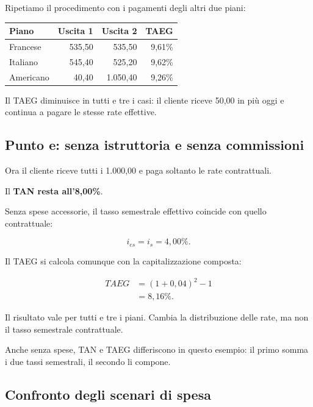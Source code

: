 \noindent Ripetiamo il procedimento
con i pagamenti degli altri due piani:

\begin{center}
    \begin{tabular}{|l|r|r|r|}
        \hline
        \textbf{Piano}
        & \textbf{Uscita 1}
        & \textbf{Uscita 2}
        & \textbf{TAEG} \\
        \hline
        Francese & 535,50 & 535,50 & 9,61\% \\
        Italiano & 545,40 & 525,20 & 9,62\% \\
        Americano & 40,40 & 1.050,40 & 9,26\% \\
        \hline
    \end{tabular}
\end{center}

\noindent Il TAEG diminuisce in tutti e tre i casi:
il cliente riceve 50,00 in più oggi
e continua a pagare le stesse rate effettive.


\subsection*{Punto e: senza istruttoria e senza commissioni}

\noindent Ora il cliente riceve
tutti i 1.000,00
e paga soltanto le rate contrattuali.

\noindent Il \textbf{TAN resta all'8,00\%}.

\noindent Senza spese accessorie,
il tasso semestrale effettivo
coincide con quello contrattuale:

\[
i_{es}=i_s=4{,}00\%.
\]

\noindent Il TAEG si calcola comunque
con la capitalizzazione composta:

\[
\begin{aligned}
TAEG
&=(1+0{,}04)^2-1\\
&=\boxed{8{,}16\%}.
\end{aligned}
\]

\noindent Il risultato vale per tutti e tre i piani.
Cambia la distribuzione delle rate,
ma non il tasso semestrale contrattuale.

\noindent Anche senza spese,
TAN e TAEG differiscono in questo esempio:
il primo somma i due tassi semestrali,
il secondo li compone.


\subsection*{Confronto degli scenari di spesa}

